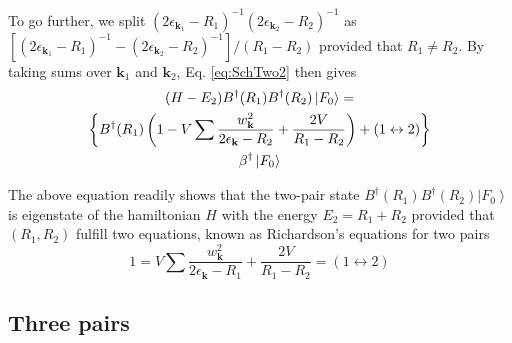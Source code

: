 \documentclass[aps,prb,superscriptaddress,twocolumn]{revtex4}
\begin{document}
To go further, we split $\left(2\epsilon_{\mathbf{k} _1}-R_1\right)
^{-1}\left(2\epsilon_{\mathbf{k} _2}-R_2\right) ^{-1}$ as $\left[%
\left(2\epsilon_{\mathbf{k} _1}-R_1\right) ^{-1}-\left(2\epsilon_{\mathbf{k}
_2}-R_2\right) ^{-1}\right] /\left(R_1-R_2\right) $ provided that $R_1\neq{}%
R_2$. By taking sums over $\mathbf{k} _1$ and $\mathbf{k} _2$, Eq. %
\eqref{eq:SchTwo2} then gives 
\begin{multline}  \label{eq:SchTwo3}
(H-E_2)B^{\dagger}(R_1)B^{\dagger}(R_2)\left|F_0\right>   = \\
\left\{B^{\dagger}(R_1)\left(1-V\sum\frac{w_{\mathbf{k} }^2}{2\epsilon_{%
\mathbf{k} }-R_2}+\frac{2V}{R_1-R_2}\right) +(1\leftrightarrow2)\right\}  \\
\beta^{\dagger}\left|F_0\right>  
\end{multline}


The above equation readily shows that the two-pair state $B^{\dagger}(R_1)B^{\dagger}(R_2)%
\left|F_0\right>  $ is eigenstate of the hamiltonian $H$ with the energy $%
E _2=R_1+R_2$ provided that $\left(R_1,R_2\right) $ fulfill two
equations, known as Richardson's equations for two pairs 
\begin{equation}
1=V\sum\frac{w_{\mathbf{k} }^2}{2\epsilon_{\mathbf{k} }-R_1}+\frac{2V}{R_1-R_2}%
=(1\leftrightarrow2)
\end{equation}

\subsection{Three pairs}
\end{document}
